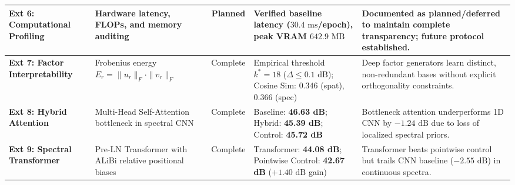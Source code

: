 \begin{table}[htbp]
\begin{adjustbox}{width=\textwidth}
\begin{tabular}{lp{3.8cm}cp{4.6cm}p{4.6cm}}
\midrule
\textbf{Ext 6: Computational Profiling} & Hardware latency, FLOPs, and memory auditing & Planned & Verified baseline latency ($30.4\text{ ms}$/epoch), peak VRAM $642.9\text{ MB}$ & Documented as planned/deferred to maintain complete transparency; future protocol established. \\
\midrule
\textbf{Ext 7: Factor Interpretability} & Frobenius energy $E_r = \|u_r\|_F \cdot \|v_r\|_F$ & Complete & Empirical threshold $k^*=18$ ($\Delta \le 0.1\text{ dB}$); Cosine Sim: $0.346$ (spat), $0.366$ (spec) & Deep factor generators learn distinct, non-redundant bases without explicit orthogonality constraints. \\
\midrule
\textbf{Ext 8: Hybrid Attention} & Multi-Head Self-Attention bottleneck in spectral CNN & Complete & Baseline: \textbf{46.63 dB}; Hybrid: \textbf{45.39 dB}; Control: \textbf{45.72 dB} & Bottleneck attention underperforms 1D CNN by $-1.24\text{ dB}$ due to loss of localized spectral priors. \\
\midrule
\textbf{Ext 9: Spectral Transformer} & Pre-LN Transformer with ALiBi relative positional biases & Complete & Transformer: \textbf{44.08 dB}; Pointwise Control: \textbf{42.67 dB} ($+1.40\text{ dB}$ gain) & Transformer beats pointwise control but trails CNN baseline ($-2.55\text{ dB}$) in continuous spectra. \\
\bottomrule
\end{tabular}
\end{adjustbox}
\end{table}
